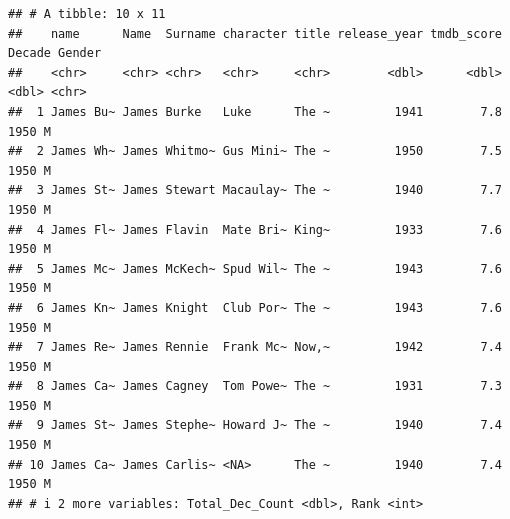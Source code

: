 \documentclass[11pt,preprint]{elsarticle}
\numberwithin{equation}{section}
\numberwithin{figure}{section}
\numberwithin{table}{section}
\begin{document}
\begin{verbatim}
## # A tibble: 10 x 11
##    name      Name  Surname character title release_year tmdb_score Decade Gender
##    <chr>     <chr> <chr>   <chr>     <chr>        <dbl>      <dbl>  <dbl> <chr> 
##  1 James Bu~ James Burke   Luke      The ~         1941        7.8   1950 M     
##  2 James Wh~ James Whitmo~ Gus Mini~ The ~         1950        7.5   1950 M     
##  3 James St~ James Stewart Macaulay~ The ~         1940        7.7   1950 M     
##  4 James Fl~ James Flavin  Mate Bri~ King~         1933        7.6   1950 M     
##  5 James Mc~ James McKech~ Spud Wil~ The ~         1943        7.6   1950 M     
##  6 James Kn~ James Knight  Club Por~ The ~         1943        7.6   1950 M     
##  7 James Re~ James Rennie  Frank Mc~ Now,~         1942        7.4   1950 M     
##  8 James Ca~ James Cagney  Tom Powe~ The ~         1931        7.3   1950 M     
##  9 James St~ James Stephe~ Howard J~ The ~         1940        7.4   1950 M     
## 10 James Ca~ James Carlis~ <NA>      The ~         1940        7.4   1950 M     
## # i 2 more variables: Total_Dec_Count <dbl>, Rank <int>
\end{verbatim}
\end{document}
